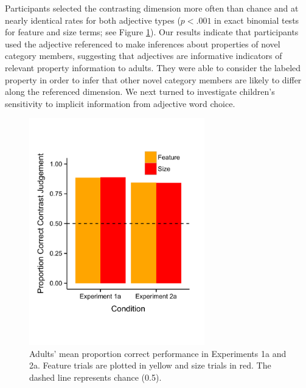 \documentclass[10pt,letterpaper]{article}
\begin{document}
Participants selected the contrasting dimension more often than chance and at nearly identical rates for both adjective types ($p < .001$ in exact binomial tests for feature and size terms; see Figure \ref{fig:adults_plot}).  Our results indicate that participants used the adjective referenced to make inferences about properties of novel category members, suggesting that adjectives are informative indicators of relevant property information to adults.  They were able to consider the labeled property in order to infer that other novel category members are likely to differ along the referenced dimension. We next turned to investigate children's sensitivity to implicit information from adjective word choice. 


	
\begin{figure}[t] 
  \begin{center} 
    \includegraphics[width=3in]{figures/adults2.pdf} 
    \caption{\label{fig:adults_plot} Adults' mean proportion correct performance in Experiments 1a and 2a. Feature trials are plotted in yellow and size trials in red. The dashed line represents chance (0.5). }
  \end{center} 
\end{figure}	
\end{document}
